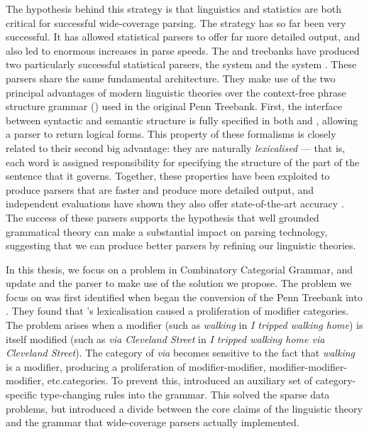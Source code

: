 The hypothesis behind this strategy is that linguistics and statistics are both
critical for successful wide-coverage parsing. The strategy has so far been very
successful. It has allowed statistical parsers to offer far more detailed
output, and also led to enormous increases in parse speeds. The \hpsg and \ccg
treebanks have produced two particularly successful statistical parsers, the
\enju system \citep{miyao:08} and the \candc system \citep{clark:cl07}. These
parsers share the same fundamental architecture. They make use of the two
principal advantages of modern linguistic theories over the context-free phrase
structure grammar (\cfpsg) used in the original Penn Treebank. First, the
interface between syntactic and semantic structure is fully
specified in both \hpsg and \ccg, allowing a parser to return logical forms.
This property of these formalisms is closely related to their
second big advantage: they are naturally
\emph{lexicalised} --- that is, each word is assigned responsibility for
specifying the structure of the part of the sentence that it governs. Together,
these properties have been exploited to produce parsers that are faster and 
produce more detailed output, and independent evaluations have shown they also offer
state-of-the-art accuracy \citep{kakkonen:08, rimell:09}. The success of these
parsers supports the hypothesis that well grounded grammatical theory can make
a substantial impact on parsing technology, suggesting that we can produce better
parsers by refining our linguistic theories.

In this thesis, we focus on a problem in Combinatory Categorial Grammar, and
update \ccgbank and the \candc parser to
make use of the solution we propose. The problem we focus on was first
identified when \citet{hock:lrec02} began the conversion of the Penn Treebank
into \ccgbank. They found that \ccg's
lexicalisation caused a proliferation of modifier categories. The problem
arises when a modifier (such as \emph{walking} in \emph{I tripped walking home})
is itself modified (such as \emph{via Cleveland Street} in \emph{I tripped walking home
via Cleveland Street}). The category of \emph{via} becomes sensitive to the fact
that \emph{walking} is a modifier, producing a proliferation of
modifier-modifier, modifier-modifier-modifier, etc.\@ categories.
To prevent this, \citet{hock:lrec02} introduced an auxiliary set of category-specific
type-changing rules into the grammar. This solved the sparse data problems, but
introduced a divide between the core claims of the linguistic theory and the
grammar that wide-coverage \ccg parsers actually implemented.

